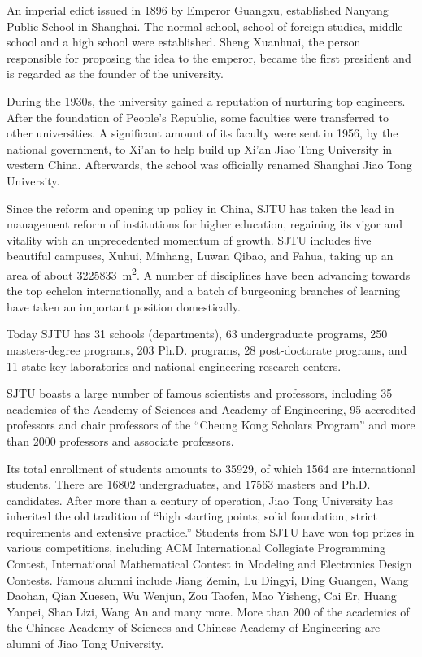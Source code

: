 
\begin{digest}
  An imperial edict issued in 1896 by Emperor Guangxu, established Nanyang
  Public School in Shanghai. The normal school, school of foreign studies,
  middle school and a high school were established. Sheng Xuanhuai, the person
  responsible for proposing the idea to the emperor, became the first president
  and is regarded as the founder of the university.

  During the 1930s, the university gained a reputation of nurturing top
  engineers. After the foundation of People's Republic, some faculties were
  transferred to other universities. A significant amount of its faculty were
  sent in 1956, by the national government, to Xi'an to help build up Xi'an Jiao
  Tong University in western China. Afterwards, the school was officially
  renamed Shanghai Jiao Tong University.

  Since the reform and opening up policy in China, SJTU has taken the lead in
  management reform of institutions for higher education, regaining its vigor
  and vitality with an unprecedented momentum of growth. SJTU includes five
  beautiful campuses, Xuhui, Minhang, Luwan Qibao, and Fahua, taking up an area
  of about \qty{3225833}{\square\metre}. A number of disciplines have been
  advancing towards the top echelon internationally, and a batch of burgeoning
  branches of learning have taken an important position domestically.

  Today SJTU has 31 schools (departments), 63 undergraduate programs, 250
  masters-degree programs, 203 Ph.D. programs, 28 post-doctorate programs, and
  11 state key laboratories and national engineering research centers.

  SJTU boasts a large number of famous scientists and professors, including 35
  academics of the Academy of Sciences and Academy of Engineering, 95 accredited
  professors and chair professors of the ``Cheung Kong Scholars Program'' and
  more than \num{2000} professors and associate professors.

  Its total enrollment of students amounts to \num{35929}, of which \num{1564}
  are international students. There are \num{16802} undergraduates, and
  \num{17563} masters and Ph.D. candidates. After more than a century of
  operation, Jiao Tong University has inherited the old tradition of ``high
  starting points, solid foundation, strict requirements and extensive
  practice.'' Students from SJTU have won top prizes in various competitions,
  including ACM International Collegiate Programming Contest, International
  Mathematical Contest in Modeling and Electronics Design Contests. Famous
  alumni include Jiang Zemin, Lu Dingyi, Ding Guangen, Wang Daohan, Qian Xuesen,
  Wu Wenjun, Zou Taofen, Mao Yisheng, Cai Er, Huang Yanpei, Shao Lizi, Wang An
  and many more. More than 200 of the academics of the Chinese Academy of
  Sciences and Chinese Academy of Engineering are alumni of Jiao Tong
  University.
\end{digest}
